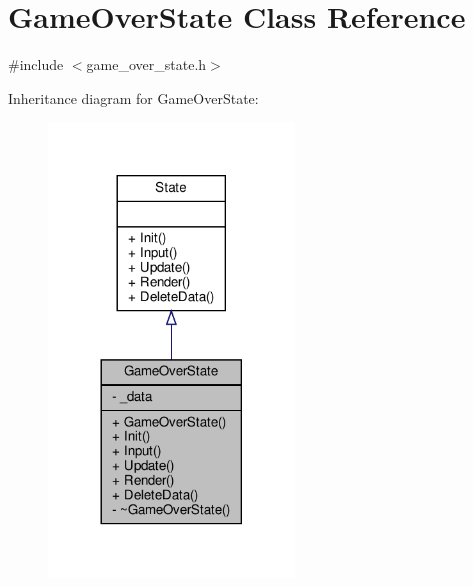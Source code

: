 \hypertarget{classGameOverState}{}\section{Game\+Over\+State Class Reference}
\label{classGameOverState}


{\ttfamily \#include $<$game\+\_\+over\+\_\+state.\+h$>$}



Inheritance diagram for Game\+Over\+State\+:
\nopagebreak
\begin{figure}[H]
\begin{center}
\leavevmode
\includegraphics[width=185pt]{classGameOverState__inherit__graph}
\end{center}
\end{figure}


